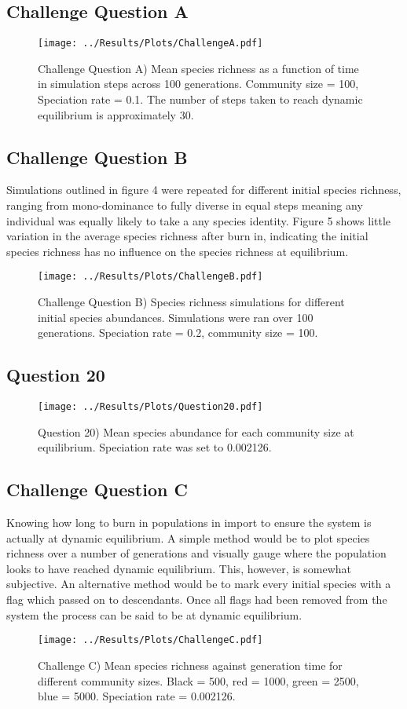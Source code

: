 \documentclass[12pt]{article}
\begin{document}
    \subsection{Challenge Question A}
	\begin{figure}[H]
		\centering
		\texttt{[image: ../Results/Plots/ChallengeA.pdf]}
		\caption{Challenge Question A) Mean species richness as a function of time in simulation steps across 100 generations. Community size = 100, Speciation rate = 0.1. The number of steps taken to reach dynamic equilibrium is approximately 30.}
	\end{figure}

	\subsection{Challenge Question B}
	Simulations outlined in figure 4 were repeated for different initial species richness, ranging from mono-dominance to fully diverse in equal steps meaning any individual was equally likely to take a any species identity. Figure 5 shows little variation in the average species richness after burn in, indicating the initial species richness has no influence on the species richness at equilibrium. 
	\begin{figure}
		\centering
		\texttt{[image: ../Results/Plots/ChallengeB.pdf]}
		\caption{Challenge Question B) Species richness simulations for different initial species abundances. Simulations were ran over 100 generations. Speciation rate = 0.2, community size = 100.}
		
	\end{figure}
	

    \subsection{Question 20}
	\begin{figure}[H]
		\centering
		\texttt{[image: ../Results/Plots/Question20.pdf]}
		\caption{Question 20) Mean species abundance for each community size at equilibrium. Speciation rate was set to 0.002126.}
	\end{figure}

	\subsection{Challenge Question C}
	Knowing how long to burn in populations in import to ensure the system is actually at dynamic equilibrium. A simple method would be to plot species richness over a number of generations and visually gauge where the population looks to have reached dynamic equilibrium. This, however, is somewhat subjective. An alternative method would be to mark every initial species with a flag which passed on to descendants. Once all flags had been removed from the system the process can be said to be at dynamic equilibrium.
	\begin{figure}[H]
		\centering
		\texttt{[image: ../Results/Plots/ChallengeC.pdf]}
		\caption{Challenge C) Mean species richness against generation time for different community sizes. Black = 500, red = 1000, green = 2500, blue = 5000. Speciation rate = 0.002126.}
	\end{figure}
\end{document}

